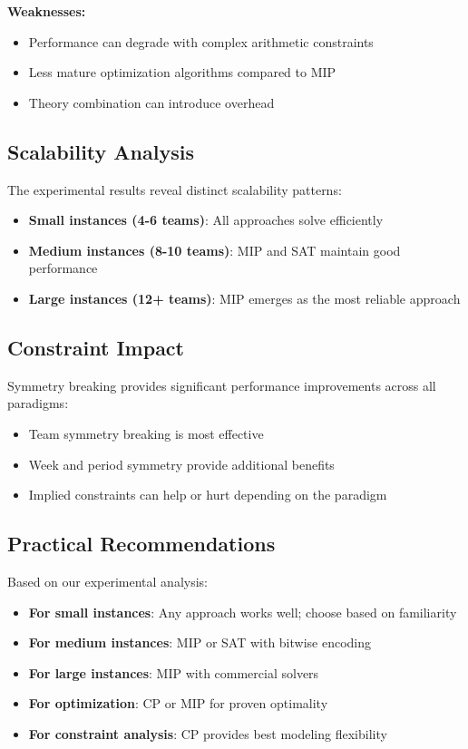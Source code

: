 \documentclass[11pt]{article}
\begin{document}
\textbf{Weaknesses:}
\begin{itemize}
    \item Performance can degrade with complex arithmetic constraints
    \item Less mature optimization algorithms compared to MIP
    \item Theory combination can introduce overhead
\end{itemize}

\subsection{Scalability Analysis}

The experimental results reveal distinct scalability patterns:

\begin{itemize}
    \item \textbf{Small instances (4-6 teams)}: All approaches solve efficiently
    \item \textbf{Medium instances (8-10 teams)}: MIP and SAT maintain good performance
    \item \textbf{Large instances (12+ teams)}: MIP emerges as the most reliable approach
\end{itemize}

\subsection{Constraint Impact}

Symmetry breaking provides significant performance improvements across all paradigms:
\begin{itemize}
    \item Team symmetry breaking is most effective
    \item Week and period symmetry provide additional benefits
    \item Implied constraints can help or hurt depending on the paradigm
\end{itemize}

\subsection{Practical Recommendations}

Based on our experimental analysis:

\begin{itemize}
    \item \textbf{For small instances}: Any approach works well; choose based on familiarity
    \item \textbf{For medium instances}: MIP or SAT with bitwise encoding
    \item \textbf{For large instances}: MIP with commercial solvers
    \item \textbf{For optimization}: CP or MIP for proven optimality
    \item \textbf{For constraint analysis}: CP provides best modeling flexibility
\end{itemize}
\end{document}
